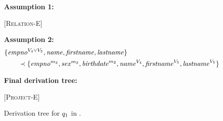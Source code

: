 \begin{figure}
\caption[Example of derivation tree to determine the type of a query]{Derivation tree for \ensuremath{\vQ_1} in .}

\scriptsize

\textbf{Assumption 1:}
\begin{prooftree*}
 [\textsc{Relation-E}] {\env [\fModel_2] [\vSch_2] {\empbio} {\annot [\fModel_2] {(\empno, \sex, \birthdate, \annot [\vFour] \name, \annot [\vFive] \fname, \annot [\vFive] \lname)}}}
\end{prooftree*}

\medskip
\textbf{Assumption 2:}
\begin{alignat*}{1}
&  { \{\annot [\vFour \vee \vFive] \empno, \name, \fname, \lname  \} }\\ 
&\qquad \prec
{\{\annot [\fModel_2] \empno, \annot [\fModel_2] \sex, \annot [\fModel_2] \birthdate, \annot [\vFour] \name, \annot [\vFive] \fname, \annot [\vFive] \lname\} } 
\end{alignat*}

\medskip
\textbf{Final derivation tree:}
\begin{prooftree*}
 [\textsc{Project-E}] { {\annot [\fModel_2] {( \annot [(\vFour \vee \vFive) \wedge \fModel_2] \empno, \annot [\vFour] \name, \annot [\vFive] \fname, \annot [\vFive] \lname)} }}
\end{prooftree*}
\end{figure}


